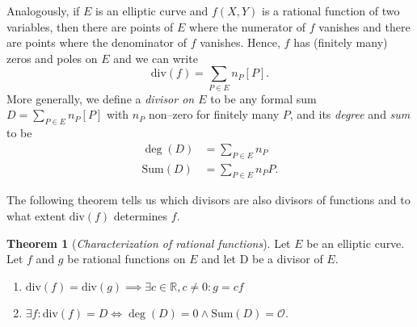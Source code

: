 \documentclass[9pt]{article}
\theoremstyle{definition}
\newtheorem{theorem}{Theorem}[section]
\begin{document}
Analogously, if $E$ is an elliptic curve and $f(X,Y)$ is a rational function of two variables, then there are points of $E$ where the numerator of $f$ vanishes and there are points where the denominator of $f$ vanishes. Hence, $f$ has (finitely many) zeros and poles on $E$ and we can write
$$\text{div}(f) = \sum_{P \in E} n_P [P].$$
More generally, we define a \textit{divisor on $E$} to be any formal sum $D = \sum_{P \in E} n_P [P]$ with $n_P$ non--zero for finitely many $P$, and its \textit{degree} and \textit{sum} to be 
\begin{align*}
    \deg(D) &= \sum_{P \in E} n_P \\
    \text{Sum}(D) &= \sum_{P \in E} n_P P.
\end{align*}

The following theorem tells us which divisors are also divisors of functions and to what extent $\text{div}(f)$ determines $f$.

\begin{theorem}[\textit{Characterization of rational functions}]
    Let $E$ be an elliptic curve. Let $f$ and $g$ be rational functions on $E$ and let D be a divisor of $E$.
    \begin{enumerate}[label=(\alph*)]
        \item $\text{div}(f) = \text{div}(g) \implies \exists c \in \mathbb{R}, c \neq 0 : g = c f$
        \item $\exists f : \text{div}(f) = D \iff \deg(D) = 0 \wedge \text{Sum}(D) = \mathcal{O}$.
    \end{enumerate}
\label{th:edivs}
\end{theorem}
\end{document}
